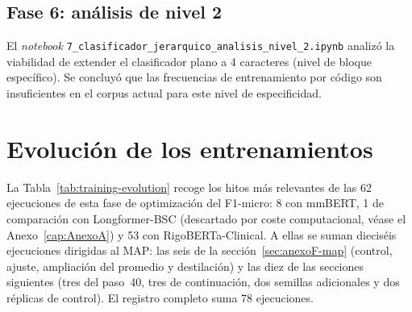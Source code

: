 \subsection{Fase 6: análisis de nivel 2}

El \emph{notebook} \texttt{7\_\allowbreak{}clasificador\_\allowbreak{}jerarquico\_\allowbreak{}analisis\_nivel\_2.ipynb} analizó la viabilidad de extender el clasificador plano a 4 caracteres (nivel de bloque específico). Se concluyó que las frecuencias de entrenamiento por código son insuficientes en el corpus actual para este nivel de especificidad.

\section{Evolución de los entrenamientos}

La Tabla~\ref{tab:training-evolution} recoge los hitos más relevantes de las 62 ejecuciones de esta fase de optimización del F1-micro: 8 con mmBERT, 1 de comparación con Longformer-BSC (descartado por coste computacional, véase el Anexo~\ref{cap:AnexoA}) y 53 con RigoBERTa-Clinical. A ellas se suman dieciséis ejecuciones dirigidas al MAP: las seis de la sección~\ref{sec:anexoF-map} (control, ajuste, ampliación del promedio y destilación) y las diez de las secciones siguientes (tres del paso~40, tres de continuación, dos semillas adicionales y dos réplicas de control). El registro completo suma 78 ejecuciones.

